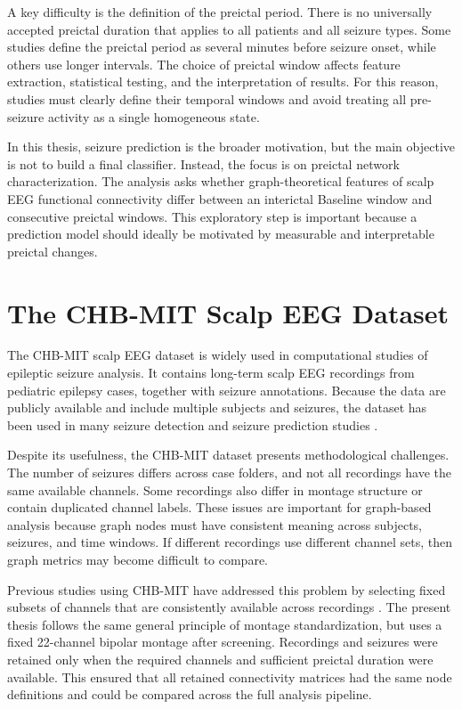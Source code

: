 A key difficulty is the definition of the preictal period. There is no
universally accepted preictal duration that applies to all patients and all
seizure types. Some studies define the preictal period as several minutes before
seizure onset, while others use longer intervals. The choice of preictal window
affects feature extraction, statistical testing, and the interpretation of
results. For this reason, studies must clearly define their temporal windows and
avoid treating all pre-seizure activity as a single homogeneous state.

In this thesis, seizure prediction is the broader motivation, but the main
objective is not to build a final classifier. Instead, the focus is on
preictal network characterization. The analysis asks whether graph-theoretical
features of scalp EEG functional connectivity differ between an interictal
Baseline window and consecutive preictal windows. This exploratory step is
important because a prediction model should ideally be motivated by measurable
and interpretable preictal changes.

\section{The CHB-MIT Scalp EEG Dataset}
\label{sec:background-chbmit}

The CHB-MIT scalp EEG dataset is widely used in computational studies of
epileptic seizure analysis. It contains long-term scalp EEG recordings from
pediatric epilepsy cases, together with seizure annotations. Because the data
are publicly available and include multiple subjects and seizures, the dataset
has been used in many seizure detection and seizure prediction studies
\cite{Tsiouris2018}.

Despite its usefulness, the CHB-MIT dataset presents methodological challenges.
The number of seizures differs across case folders, and not all recordings have
the same available channels. Some recordings also differ in montage structure or
contain duplicated channel labels. These issues are important for graph-based
analysis because graph nodes must have consistent meaning across subjects,
seizures, and time windows. If different recordings use different channel sets,
then graph metrics may become difficult to compare.

Previous studies using CHB-MIT have addressed this problem by selecting fixed
subsets of channels that are consistently available across recordings
\cite{Tsiouris2018}. The present thesis follows the same general principle of
montage standardization, but uses a fixed \num{22}-channel bipolar montage after
screening. Recordings and seizures were retained only when the required channels
and sufficient preictal duration were available. This ensured that all retained
connectivity matrices had the same node definitions and could be compared
across the full analysis pipeline.

